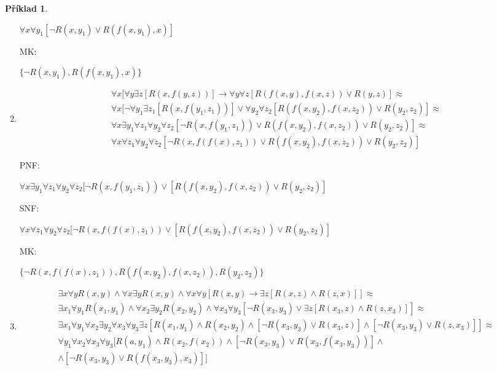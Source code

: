 \documentclass[a4paper]{article}
\theoremstyle{definition}
\newtheorem{priklad}{Příklad}
\begin{document}
\begin{priklad}
\begin{enumerate}
        $ \forall x\forall y_1[\neg R(x,y_1) \vee R(f(x,y_1),x)] $

        MK:

        $ \lbrace\neg R(x,y_1), R(f(x,y_1),x)\rbrace $

        \item
       {\setlength{\mathindent}{0cm}
        \setlength\abovedisplayskip{-1.5em}
        \begin{multline*}
        \forall x[\forall y\exists z[R(x,f(y,z))]\rightarrow \forall y\forall z[R(f(x,y),f(x,z))\vee R(y,z)] \approx\\
         \forall x[\neg \forall y_1\exists z_1[R(x,f(y_1,z_1))]\vee\forall y_2\forall z_2[R(f(x,y_2),f(x,z_2))\vee R(y_2,z_2)] \approx\\
         \forall x \exists y_1\forall z_1\forall y_2\forall z_2[\neg R(x,f(y_1,z_1))\vee R(f(x,y_2),f(x,z_2))\vee R(y_2,z_2)] \approx\\
         \forall x\forall z_1\forall y_2\forall z_2[\neg R(x,f(f(x),z_1))\vee R(f(x,y_2),f(x,z_2))\vee R(y_2,z_2)]
        \end{multline*}}

        PNF:

        $ \forall x \exists y_1\forall z_1\forall y_2\forall z_2[\neg R(x,f(y_1,z_1))\vee [R(f(x,y_2),f(x,z_2))\vee R(y_2,z_2)] $

        SNF:

        $ \forall x\forall z_1\forall y_2\forall z_2[\neg R(x,f(f(x),z_1))\vee [R(f(x,y_2),f(x,z_2))\vee R(y_2,z_2)] $

        MK:

        $ \lbrace\neg R(x,f(f(x),z_1)), R(f(x,y_2),f(x,z_2)), R(y_2,z_2)\rbrace $

        \item
        {\setlength{\mathindent}{0cm}
        \setlength\abovedisplayskip{-1.5em}
        \begin{multline*}
        \exists x\forall yR(x,y)\wedge\forall x\exists yR(x,y)\wedge \forall x\forall y\left[R(x,y)\rightarrow\exists z\left[R(x,z)\wedge R(z,x)\right]\right] \approx\\
        \exists x_1\forall y_1R(x_1,y_1)\wedge\forall x_2\exists y_2R(x_2,y_2)\wedge \forall x_3\forall y_3\left[\neg R(x_3,y_3)\vee\exists z\left[R(x_3,z)\wedge R(z,x_3)\right]\right] \approx\\
        \exists x_1\forall y_1\forall x_2\exists y_2\forall x_3\forall y_3\exists z[R(x_1,y_1)\wedge R(x_2,y_2)\wedge \left[\neg R(x_3,y_3)\vee R(x_3,z)\right]\wedge[\neg R(x_3,y_3)\vee R(z,x_3)]]\approx\\
        \forall y_1\forall x_2\forall x_3\forall y_3[R(a,y_1)\wedge R(x_2,f(x_2))\wedge \left[\neg R(x_3,y_3)\vee R(x_3,f(x_3,y_3))\right]\wedge\\ \wedge[\neg R(x_3,y_3)\vee R(f(x_3,y_3),x_3)]]
        \end{multline*}
        }


\end{enumerate}
\end{priklad}
\end{document}
